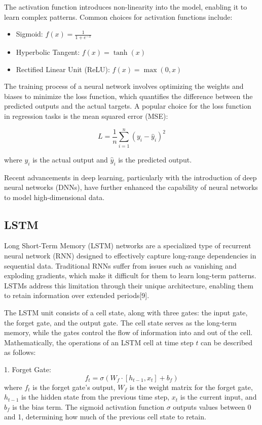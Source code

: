 \documentclass[a4paper,12pt]{article}
\begin{document}
The activation function introduces non-linearity into the model, enabling it to learn complex patterns. Common choices for activation functions include:

\begin{itemize}
    \item Sigmoid: \(f(x) = \frac{1}{1 + e^{-x}}\)
    \item Hyperbolic Tangent: \(f(x) = \tanh(x)\)
    \item Rectified Linear Unit (ReLU): \(f(x) = \max(0, x)\)
\end{itemize}

The training process of a neural network involves optimizing the weights and biases to minimize the loss function, which quantifies the difference between the predicted outputs and the actual targets. A popular choice for the loss function in regression tasks is the mean squared error (MSE):

\begin{equation}
L = \frac{1}{n} \sum_{i=1}^{n} (y_i - \hat{y}_i)^2
\end{equation}

where \(y_i\) is the actual output and \(\hat{y}_i\) is the predicted output.

Recent advancements in deep learning, particularly with the introduction of deep neural networks (DNNs), have further enhanced the capability of neural networks to model high-dimensional data.

\subsection{LSTM}

Long Short-Term Memory (LSTM) networks are a specialized type of recurrent neural network (RNN) designed to effectively capture long-range dependencies in sequential data. Traditional RNNs suffer from issues such as vanishing and exploding gradients, which make it difficult for them to learn long-term patterns. LSTMs address this limitation through their unique architecture, enabling them to retain information over extended periods[9].

The LSTM unit consists of a cell state, along with three gates: the input gate, the forget gate, and the output gate. The cell state serves as the long-term memory, while the gates control the flow of information into and out of the cell. Mathematically, the operations of an LSTM cell at time step \(t\) can be described as follows:

1. Forget Gate:
\begin{equation}
f_t = \sigma(W_f \cdot [h_{t-1}, x_t] + b_f)
\end{equation}
where \(f_t\) is the forget gate's output, \(W_f\) is the weight matrix for the forget gate, \(h_{t-1}\) is the hidden state from the previous time step, \(x_t\) is the current input, and \(b_f\) is the bias term. The sigmoid activation function \(\sigma\) outputs values between 0 and 1, determining how much of the previous cell state to retain.
\end{document}
